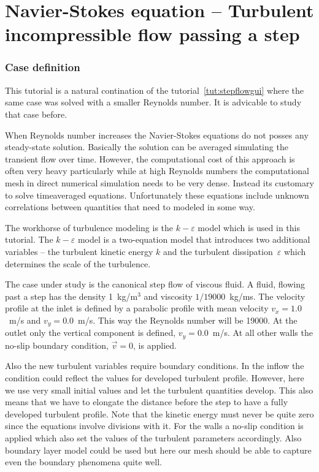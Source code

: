 \chapter{Navier-Stokes equation -- Turbulent incompressible flow passing a step}
\label{tut:stepflowke}



\subsection*{Case definition}

This tutorial is a natural contination of the tutorial~\ref{tut:stepflowgui}
where the same case was solved with a smaller Reynolds number. It is advicable 
to study that case before. 

When Reynolds number increases the 
Navier-Stokes equations do not posses any steady-state 
solution. Basically the solution can be averaged simulating the transient 
flow over time. However, the computational cost of this approach is often very 
heavy particularly while at high Reynolds numbers the computational mesh
in direct numerical simulation needs to be very dense. Instead its customary
to solve timeaveraged equations. Unfortunately these equations include 
unknown correlations between quantities that need to modeled in some way.

The workhorse of turbulence modeling is the $k-\varepsilon$ model which 
is used in this tutorial. The $k-\varepsilon$ model is a two-equation model
that introduces two additional variables -- the turbulent kinetic energy $k$ and the 
turbulent dissipation~$\varepsilon$
which determines the scale of the turbulence.

The case under study is the canonical step flow of viscous fluid. 
A fluid, flowing past a step has the density
1~kg/m$^3$ and viscosity $1/19000$~kg/ms. The velocity profile at the inlet is
defined by a parabolic profile with mean velocity 
$v_x=1.0$~m/s and $v_y=0.0$~m/s. 
This way the Reynolds number will be 19000.
At the outlet only 
the vertical component is defined, $v_y=0.0$~m/s. At all other
walls the no-slip boundary condition, $\vec{v}=0$, is applied. 

Also the new turbulent variables require boundary conditions. 
In the inflow the condition could reflect the values for developed turbulent
profile. However, here we use very small initial values and let the turbulent quantities 
develop. This also means that we have to elongate the distance before the step 
to have a fully developed turbulent profile. 
Note that the kinetic energy must 
never be quite zero since the equations involve divisions with it.  
For the walls a no-slip condition is applied which also set the values of the
turbulent parameters accordingly. Also boundary layer model could be used but here
our mesh should be able to capture even the boundary phenomena quite well. 

